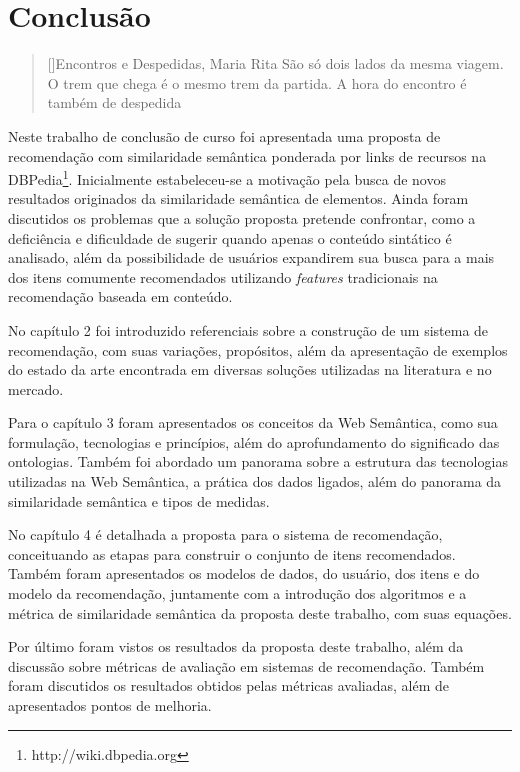 \chapter{Conclusão}
\label{cap:conclusion}

\begin{quotation}[]{Encontros e Despedidas, Maria Rita}
São só dois lados da mesma viagem. O trem que chega é o mesmo trem da partida. A hora do encontro é também de despedida
\end{quotation}

Neste trabalho de conclusão de curso foi apresentada uma proposta de recomendação com similaridade semântica ponderada por links de recursos na DBPedia\footnote{http://wiki.dbpedia.org}. Inicialmente estabeleceu-se a motivação pela busca de novos resultados originados da similaridade semântica de elementos. Ainda foram discutidos os problemas que a solução proposta pretende confrontar, como a deficiência e dificuldade de sugerir quando apenas o conteúdo sintático é analisado, além da possibilidade de usuários expandirem sua busca para a mais dos itens comumente recomendados utilizando \textit{features} tradicionais na recomendação baseada em conteúdo.

No capítulo 2 foi introduzido referenciais sobre a construção de um sistema de recomendação, com suas variações, propósitos, além da apresentação de exemplos do estado da arte encontrada em diversas soluções utilizadas na literatura e no mercado.

Para o capítulo 3 foram apresentados os conceitos da Web Semântica, como sua formulação, tecnologias e princípios, além do aprofundamento do significado das ontologias. Também foi abordado um panorama sobre a estrutura das tecnologias utilizadas na Web Semântica, a prática dos dados ligados, além do panorama da similaridade semântica e tipos de medidas.

No capítulo 4 é detalhada a proposta para o sistema de recomendação, conceituando as etapas para construir o conjunto de itens recomendados. Também foram apresentados os modelos de dados, do usuário, dos itens e do modelo da recomendação, juntamente com a introdução dos algoritmos e a métrica de similaridade semântica da proposta deste trabalho, com suas equações.

Por último foram vistos os resultados da proposta deste trabalho, além da discussão sobre métricas de avaliação em sistemas de recomendação. Também foram discutidos os resultados obtidos pelas métricas avaliadas, além de apresentados pontos de melhoria.

